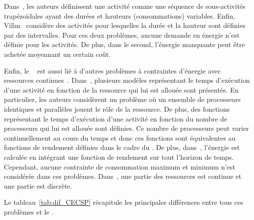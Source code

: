 Dans~\cite{BP}, les auteurs définissent une activité comme une
séquence de sous-activités trapézoïdales ayant des durées et hauteurs
(consommations) variables. Enfin, Vil{\`i}m~\cite{V09} considère des
activités pour lesquelles la durée et la hauteur sont définies par des
intervalles. Pour ces deux problèmes, aucune demande en énergie n'est
définie pour les activités. De plus, dans le second, l'énergie
manquante peut être achetée moyennant un certain coût.

Enfin, le \CECSP~ est aussi lié à d'autres problèmes à contraintes
d'énergie avec ressources continues~\cite{Blaz,Wali}.
Dans~\cite{Blaz}, plusieurs modèles représentant le temps d'exécution
d'une activité en fonction de la ressource qui lui est allouée sont
présentés. En particulier, les auteurs considèrent un problème où 
un ensemble de processeurs identiques et parallèles jouent le rôle de
la ressource. De plus, des fonctions représentant le temps d'exécution
d'une activité en fonction du nombre de processeurs qui lui est
allouée sont définies. Ce nombre de processeurs peut varier
continuellement au cours du temps et donc ces fonctions sont
équivalentes au fonctions de rendement définies dans le cadre du
\CECSP. De plus, dans~\cite{Blaz,Wali}, l'énergie est calculée en
intégrant une fonction de rendement sur tout l'horizon de temps.
Cependant, aucune contrainte de consommation maximum et minimum n'est
considérée dans ces problèmes. Dans~\cite{Wali}, une partie des
ressources est continue et une partie est discrète.

Le tableau~\ref{tab:dif_CECSP} récapitule les principales différences
entre tous ces problèmes et le \CECSP. 

